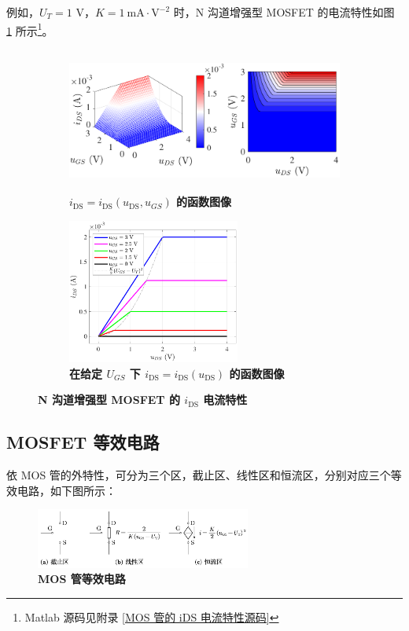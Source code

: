 \documentclass[UTF8]{report}
\theoremstyle{MyLineTheoremStyle} %
\theoremstyle{MyBlockTheoremStyle} %
\theoremstyle{MySubsubsectionStyle} %
\begin{document}
例如，$U_T = 1$ V，$K = 1\ \mathrm{mA \cdot V^{-2}}$ 时，N 沟道增强型 MOSFET 的电流特性如图 \ref{MOS 管的 iDS 电流特性} 所示\footnote{Matlab 源码见附录 \ref{MOS 管的 iDS 电流特性源码}}。

\begin{figure}[H]\centering
\begin{subfigure}[t]{0.67\textwidth}\centering
    \includegraphics[height=135pt]{assets/2/MOS管外特性.pdf}
    \caption{\bfseries $i_{\text{DS}} = i_{\text{DS}}(u_{\text{DS}}, u_{GS})$ 的函数图像 }
\end{subfigure}\begin{subfigure}[t]{0.33\textwidth}\centering
    \includegraphics[height=135pt]{assets/2/MOS管外特性 (2).pdf}
    \caption{\bfseries 在给定 $U_{GS}$ 下 $i_{\text{DS}} = i_{\text{DS}}(u_{\text{DS}})$ 的函数图像 }
\end{subfigure}
\caption{\bfseries N 沟道增强型 MOSFET 的 $i_{\text{DS}}$ 电流特性 }\label{MOS 管的 iDS 电流特性}
\end{figure}

\subsection{MOSFET 等效电路}

依 MOS 管的外特性，可分为三个区，截止区、线性区和恒流区，分别对应三个等效电路，如下图所示：
\begin{figure}[H]\centering
\includegraphics[width=0.63\textwidth]{assets/2/MOS管等效电路.png}
\caption{\bfseries MOS 管等效电路}\label{MOS管等效电路}
\end{figure}
\end{document}

